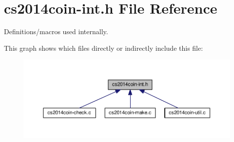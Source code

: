 \hypertarget{cs2014coin-int_8h}{}\section{cs2014coin-\/int.h File Reference}
\label{cs2014coin-int_8h}


Definitions/macros used internally.  


This graph shows which files directly or indirectly include this file\+:\nopagebreak
\begin{figure}[H]
\begin{center}
\leavevmode
\includegraphics[width=350pt]{cs2014coin-int_8h__dep__incl}
\end{center}
\end{figure}
